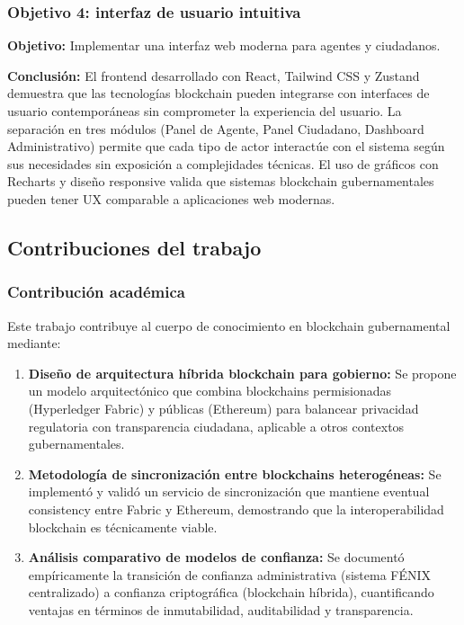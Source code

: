 \subsubsection{Objetivo 4: interfaz de usuario intuitiva}

\textbf{Objetivo:} Implementar una interfaz web moderna para agentes y ciudadanos.

\textbf{Conclusión:} El frontend desarrollado con React, Tailwind CSS y Zustand demuestra que las tecnologías blockchain pueden integrarse con interfaces de usuario contemporáneas sin comprometer la experiencia del usuario. La separación en tres módulos (Panel de Agente, Panel Ciudadano, Dashboard Administrativo) permite que cada tipo de actor interactúe con el sistema según sus necesidades sin exposición a complejidades técnicas. El uso de gráficos con Recharts y diseño responsive valida que sistemas blockchain gubernamentales pueden tener UX comparable a aplicaciones web modernas.

\subsection{Contribuciones del trabajo}

\subsubsection{Contribución académica}

Este trabajo contribuye al cuerpo de conocimiento en blockchain gubernamental mediante:

\begin{enumerate}
    \item \textbf{Diseño de arquitectura híbrida blockchain para gobierno:} Se propone un modelo arquitectónico que combina blockchains permisionadas (Hyperledger Fabric) y públicas (Ethereum) para balancear privacidad regulatoria con transparencia ciudadana, aplicable a otros contextos gubernamentales.
    
    \item \textbf{Metodología de sincronización entre blockchains heterogéneas:} Se implementó y validó un servicio de sincronización que mantiene eventual consistency entre Fabric y Ethereum, demostrando que la interoperabilidad blockchain es técnicamente viable.
    
    \item \textbf{Análisis comparativo de modelos de confianza:} Se documentó empíricamente la transición de confianza administrativa (sistema FÉNIX centralizado) a confianza criptográfica (blockchain híbrida), cuantificando ventajas en términos de inmutabilidad, auditabilidad y transparencia.
\end{enumerate}

